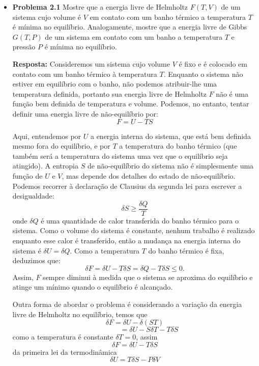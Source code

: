 \documentclass[12pt]{article}
\begin{document}
 \begin{itemize}
     \item \textbf{Problema 2.1} Mostre que a energia livre de Helmholtz $F(T, V)$ de um sistema cujo volume é $V$ em contato com um banho térmico a temperatura $T$ é mínima no equilíbrio. Analogamente, mostre que a energia livre de Gibbs $G(T, P)$ de um sistema em contato com um banho a temperatura $T$ e pressão $P$ é mínima no equilíbrio.

     \textbf{Resposta:}
     Consideremos um sistema cujo volume $V$ é fixo e é colocado em contato com um banho térmico à temperatura $T$. Enquanto o sistema não estiver em equilíbrio com o banho, não podemos atribuir-lhe uma temperatura definida, portanto sua energia livre de Helmholtz $F$ não é uma função bem definida de temperatura e volume. Podemos, no entanto, tentar definir uma energia livre de não-equilíbrio por:
     \begin{equation*}
         F = U - TS
     \end{equation*}
     
     Aqui, entendemos por $U$ a energia interna do sistema, que está bem definida mesmo fora do equilíbrio, e por $T$ a temperatura do banho térmico (que também será a temperatura do sistema uma vez que o equilíbrio seja atingido). A entropia $S$ de não-equilíbrio do sistema não é simplesmente uma função de $U$ e $V$, mas depende dos detalhes do estado de não-equilíbrio. Podemos recorrer à declaração de Clausius da segunda lei para escrever a desigualdade:
     \begin{equation}
         \delta S \geq \frac{\delta Q}{T}
     \end{equation}
     onde $\delta Q$ é uma quantidade de calor transferida do banho térmico para o sistema. Como o volume do sistema é constante, nenhum trabalho é realizado enquanto esse calor é transferido, então a mudança na energia interna do sistema é $\delta U = \delta Q$. Como a temperatura $T$ do banho térmico é fixa, deduzimos que:
     \begin{equation}
         \delta F = \delta U - T \delta S = \delta Q - T \delta S \leq 0.
     \end{equation}
     Assim, $F$ sempre diminui à medida que o sistema se aproxima do equilíbrio e atinge um mínimo quando o equilíbrio é alcançado.
    
     Outra forma de abordar o problema é considerando a variação da energia livre de Helmholtz no equilíbrio, temos que
     \[
         \delta F = \delta U - \delta (S T)  
     \]
     \[
       \quad \quad \quad \quad = \delta U - S \delta T - T \delta S
     \]
    como a temperatura é constante $\delta T = 0$, assim
    \[
         \delta F = \delta U - T \delta S  
     \]
     da primeira lei da termodinâmica
     \begin{equation}
         \delta U = T \delta S - P \delta V
     \end{equation}


\end{itemize}
\end{document}
